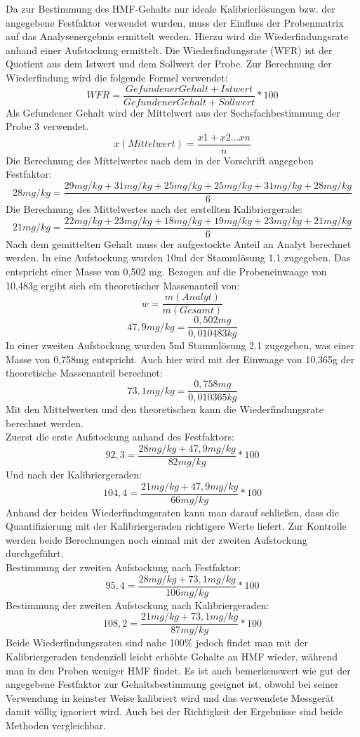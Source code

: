 Da zur Bestimmung des HMF-Gehalts nur ideale Kalibrierlösungen bzw. der angegebene Festfaktor verwendet wurden, muss der Einfluss der Probenmatrix auf das Analysenergebnis ermittelt werden. Hierzu wird die Wiederfindungsrate anhand einer Aufstockung ermittelt. Die Wiederfindungsrate (WFR) ist der Quotient aus dem Istwert und dem Sollwert der Probe. Zur Berechnung der Wiederfindung wird die folgende Formel verwendet:
	\[WFR=\frac{ Gefundener Gehalt + Istwert }{ Gefundener Gehalt + Sollwert } *100 \]
Als Gefundener Gehalt wird der Mittelwert aus der Sechsfachbestimmung der Probe 3 verwendet.
	\[x(Mittelwert)=\frac{ x1+x2...xn }{ n } \]
Die Berechnung des Mittelwertes nach dem in der Vorschrift angegeben  Festfaktor:
	\[28mg/kg=\frac{ 29mg/kg+31mg/kg+25mg/kg+25mg/kg+31mg/kg+28mg/kg }{ 6 } \]
Die Berechnung des Mittelwertes nach der erstellten Kalibriergerade:
	\[21mg/kg=\frac{ 22mg/kg+23mg/kg+18mg/kg+19mg/kg+23mg/kg+21mg/kg }{ 6 } \]
Nach dem gemittelten Gehalt muss der aufgestockte Anteil an Analyt berechnet werden. In eine Aufstockung wurden 10ml der Stammlösung 1.1 zugegeben. Das entspricht einer Masse von 0,502 mg. Bezogen auf die Probeneinwaage von 10,483g ergibt sich ein theoretischer Massenanteil von:  
	\[w=\frac{ m(Analyt) }{ m(Gesamt) } \]
	\[47,9mg/kg=\frac{ 0,502mg }{ 0,010483kg } \]
In einer zweiten Aufstockung wurden 5ml Stammlösung 2.1 zugegeben, was einer Masse von 0,758mg entspricht. Auch hier wird mit der Einwaage von 10,365g der theoretische Massenanteil berechnet:
	\[73,1mg/kg=\frac{ 0,758mg }{ 0,010365kg } \]
Mit den Mittelwerten und den theoretischen kann die Wiederfindungsrate berechnet werden.\\
Zuerst die erste Aufstockung anhand des Festfaktors:
	\[92,3=\frac{ 28mg/kg + 47,9mg/kg }{ 82mg/kg } *100 \]
Und nach der Kalibriergeraden:
	\[104,4=\frac{ 21mg/kg + 47,9mg/kg }{ 66mg/kg } *100 \]
Anhand der beiden Wiederfindungsraten kann man darauf schließen, dass die Quantifizierung mit der Kalibriergeraden richtigere Werte liefert. Zur Kontrolle werden beide Berechnungen noch einmal mit der zweiten Aufstockung durchgeführt.\\
Bestimmung der zweiten Aufstockung nach Festfaktor:
	\[95,4=\frac{ 28mg/kg + 73,1mg/kg }{ 106mg/kg } *100 \]
Bestimmung der zweiten Aufstockung nach Kalibriergeraden:
	\[108,2=\frac{ 21mg/kg + 73,1mg/kg }{ 87mg/kg } *100 \]
Beide Wiederfindungsraten sind nahe 100\% jedoch findet man mit der Kalibriergeraden tendenziell leicht erhöhte Gehalte an HMF wieder, während man in den Proben weniger HMF findet. Es ist auch bemerkenswert wie gut der angegebene Festfaktor zur Gehaltsbestimmung geeignet ist, obwohl bei seiner Verwendung in keinster Weise kalibriert wird und das verwendete Messgerät damit völlig ignoriert wird. Auch bei der Richtigkeit der Ergebnisse sind beide Methoden vergleichbar.

